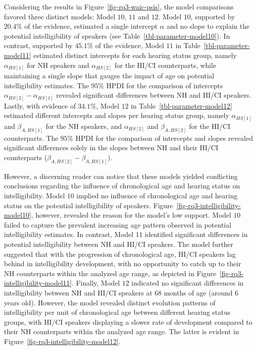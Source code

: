 \documentclass[
  authoryear,
  preprint,
  1p]{elsarticle}
\begin{document}
Considering the results in Figure~\ref{fig-rq3-waic-psis}, the model
comparisons favored three distinct models: Model \(10\), \(11\) and
\(12\). Model \(10\), supported by \(20.4\%\) of the evidence, estimated
a single intercept \(\alpha\) and no slope to explain the potential
intelligibility of speakers (see Table~\ref{tbl-parameter-model10}). In
contrast, supported by \(45.1\%\) of the evidence, Model \(11\) in
Table~\ref{tbl-parameter-model11} estimated distinct intercepts for each
hearing status group, namely \(\alpha_{HS[1]}\) for NH speakers and
\(\alpha_{HS[2]}\) for the HI/CI counterparts, while maintaining a
single slope that gauges the impact of age on potential intelligibility
estimates. The \(95\%\) HPDI for the comparison of intercepts
\(\alpha_{HS[2]}-\alpha_{HS[1]}\) revealed significant differences
between NH and HI/CI speakers. Lastly, with evidence of \(34.1\%\),
Model \(12\) in Table~\ref{tbl-parameter-model12} estimated different
intercepts and slopes per hearing status group, namely
\(\alpha_{HS[1]}\) and \(\beta_{A,HS[1]}\) for the NH speakers, and
\(\alpha_{HS[2]}\) and \(\beta_{A,HS[2]}\) for the HI/CI counterparts.
The \(95\%\) HPDI for the comparison of intercepts and slopes revealed
significant differences solely in the slopes between NH and their HI/CI
counterparts (\(\beta_{A,HS[2]}-\beta_{A,HS[1]}\)).

However, a discerning reader can notice that these models yielded
conflicting conclusions regarding the influence of chronological age and
hearing status on intelligibility. Model \(10\) implied no influence of
chronological age and hearing status on the potential intelligibility of
speakers. Figure~\ref{fig-rq3-intelligibility-model10}, however,
revealed the reason for the model's low support. Model \(10\) failed to
capture the prevalent increasing age pattern observed in potential
intelligibility estimates. In contrast, Model \(11\) identified
significant differences in potential intelligibility between NH and
HI/CI speakers. The model further suggested that with the progression of
chronological age, HI/CI speakers lag behind in intelligibility
development, with no opportunity to catch up to their NH counterparts
within the analyzed age range, as depicted in
Figure~\ref{fig-rq3-intelligibility-model11}. Finally, Model \(12\)
indicated no significant differences in intelligibility between NH and
HI/CI speakers at \(68\) months of age (around \(6\) years old).
However, the model revealed distinct evolution patterns of
intelligibility per unit of chronological age between different hearing
status groups, with HI/CI speakers displaying a slower rate of
development compared to their NH counterparts within the analyzed age
range. The latter is evident in
Figure~\ref{fig-rq3-intelligibility-model12}.
\end{document}
